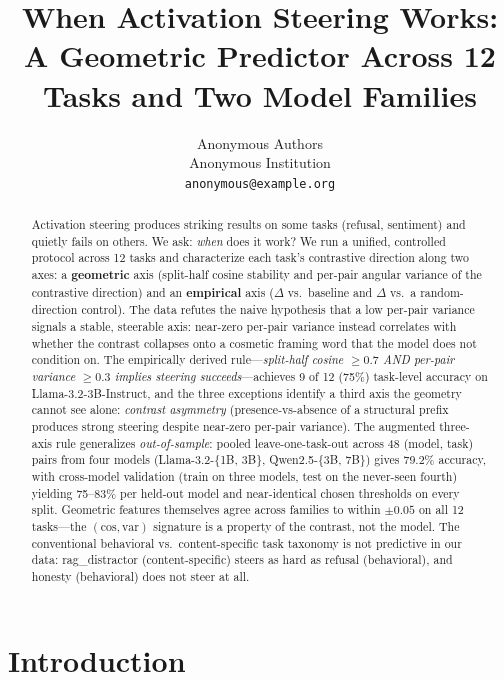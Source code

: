 \documentclass{article}
\title{When Activation Steering Works:\\
       A Geometric Predictor Across 12 Tasks and Two Model Families}
\author{Anonymous Authors\\
        Anonymous Institution\\
        \texttt{anonymous@example.org}}
\begin{document}
\maketitle

\begin{abstract}
Activation steering produces striking results on some tasks (refusal,
sentiment) and quietly fails on others. We ask: \emph{when} does it
work? We run a unified, controlled protocol across 12 tasks and
characterize each task's contrastive direction along two axes: a
\textbf{geometric} axis (split-half cosine stability and per-pair
angular variance of the contrastive direction) and an \textbf{empirical}
axis ($\Delta$ vs.~baseline and $\Delta$ vs.~a random-direction control).
The data refutes the naive hypothesis that a low per-pair variance
signals a stable, steerable axis: near-zero per-pair variance instead
correlates with whether the contrast collapses onto a cosmetic
framing word that the model does not condition on. The empirically
derived rule---\emph{split-half cosine $\geq 0.7$ AND per-pair
variance $\geq 0.3$ implies steering succeeds}---achieves 9 of 12
(75\%) task-level accuracy on Llama-3.2-3B-Instruct, and the
three exceptions identify a third axis the geometry cannot see alone:
\emph{contrast asymmetry} (presence-vs-absence of a structural prefix
produces strong steering despite near-zero per-pair variance). The
augmented three-axis rule generalizes \emph{out-of-sample}: pooled
leave-one-task-out across 48 (model, task) pairs from four models
(Llama-3.2-\{1B, 3B\}, Qwen2.5-\{3B, 7B\}) gives 79.2\% accuracy,
with cross-model validation (train on three models, test on the
never-seen fourth) yielding 75--83\% per held-out model and
near-identical chosen thresholds on every split. Geometric features
themselves agree across families to within $\pm 0.05$ on all 12
tasks---the $(\text{cos}, \text{var})$ signature is a property of the
contrast, not the model. The conventional behavioral
vs.~content-specific task taxonomy is not predictive in our data:
rag\_distractor (content-specific) steers as hard as refusal
(behavioral), and honesty (behavioral) does not steer at all.
\end{abstract}

\section{Introduction}
\end{document}
